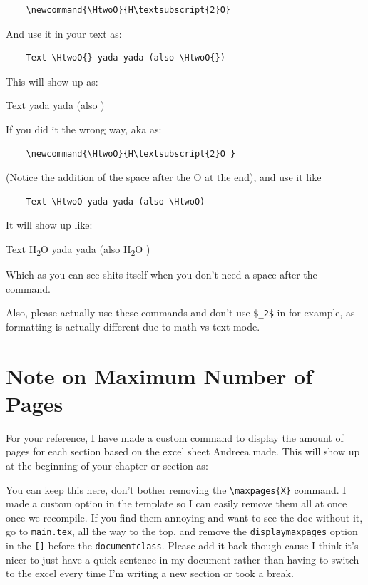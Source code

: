 \documentclass[../main.tex]{subfiles}
\begin{document}
\begin{verbatim}
    \newcommand{\HtwoO}{H\textsubscript{2}O}
\end{verbatim}

And use it in your text as:

\begin{verbatim}
    Text \HtwoO{} yada yada (also \HtwoO{})
\end{verbatim}

This will show up as:

Text \HtwoO{} yada yada (also \HtwoO{})

If you did it the wrong way, aka as:

\begin{verbatim}
    \newcommand{\HtwoO}{H\textsubscript{2}O }
\end{verbatim}

(Notice the addition of the space after the O at the end), and use it like

\begin{verbatim}
    Text \HtwoO yada yada (also \HtwoO)
\end{verbatim}

It will show up like:

\newcommand{\HtwoOspace}{H\textsubscript{2}O }

Text \HtwoOspace yada yada (also \HtwoOspace)

Which as you can see shits itself when you don't need a space after the command.

Also, please actually use these commands and don't use \texttt{\$\_2\$} in \HtoGO{} for example, as formatting is actually different due to math vs text mode.

\section{Note on Maximum Number of Pages}

For your reference, I have made a custom command to display the amount of pages for each section based on the excel sheet Andreea made. This will show up at the beginning of your chapter or section as:


You can keep this here, don't bother removing the \texttt{\textbackslash maxpages\{X\}} command. I made a custom option in the template so I can easily remove them all at once once we recompile. If you find them annoying and want to see the doc without it, go to \texttt{main.tex}, all the way to the top, and remove the \texttt{displaymaxpages} option in the \texttt{[]} before the \texttt{documentclass}. Please add it back though cause I think it's nicer to just have a quick sentence in my document rather than having to switch to the excel every time I'm writing a new section or took a break.
\end{document}
